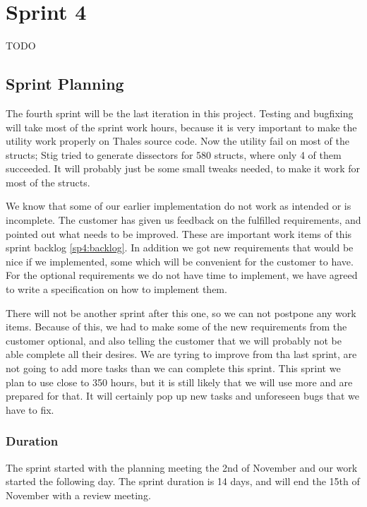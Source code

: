 \chapter{Sprint 4}
TODO

\section{Sprint Planning}
The fourth sprint will be the last iteration in this project. Testing and bugfixing will take most of the sprint work hours, because it is very important to make the utility work properly on Thales source code. Now the utility fail on most of the structs; Stig tried to generate dissectors for 580 structs, where only 4 of them succeeded. It will probably just be some small tweaks needed, to make it work for most of the structs.

We know that some of our earlier implementation do not work as intended or is incomplete. The customer has given us feedback on the fulfilled requirements, and pointed out what needs to be improved. These are important work items of this sprint backlog \ref{sp4:backlog}. In addition we got new requirements that would be nice if we implemented, some which will be convenient for the customer to have. For the optional requirements we do not have time to implement, we have agreed to write a specification on how to implement them. 

There will not be another sprint after this one, so we can not postpone any work items. Because of this, we had to make some of the new requirements from the customer optional, and also telling the customer that we will probably not be able complete all their desires. We are tyring to improve from tha last sprint, are not going to add more tasks than we can complete this sprint. This sprint we plan to use close to 350 hours, but it is still likely that we will use more and are prepared for that. It will certainly pop up new tasks and unforeseen bugs that we have to fix.

\subsection{Duration}
The sprint started with the planning meeting the 2nd of November and our work started the following day. The sprint duration is 14 days, and will end the 15th of November with a review meeting. 


